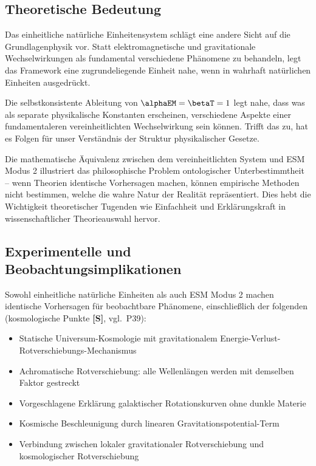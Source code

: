 	\subsection{Theoretische Bedeutung}
	\label{subsec:theoretical_significance}
	
	Das einheitliche natürliche Einheitensystem schlägt eine andere Sicht auf die Grundlagenphysik vor. Statt elektromagnetische und gravitationale Wechselwirkungen als fundamental verschiedene Phänomene zu behandeln, legt das Framework eine zugrundeliegende Einheit nahe, wenn in wahrhaft natürlichen Einheiten ausgedrückt.
	
	Die selbstkonsistente Ableitung von $\alphaEM = \betaT = 1$ legt nahe, dass was als separate physikalische Konstanten erscheinen, verschiedene Aspekte einer fundamentaleren vereinheitlichten Wechselwirkung sein können. Trifft das zu, hat es Folgen für unser Verständnis der Struktur physikalischer Gesetze.
	
	Die mathematische Äquivalenz zwischen dem vereinheitlichten System und ESM Modus 2 illustriert das philosophische Problem ontologischer Unterbestimmtheit – wenn Theorien identische Vorhersagen machen, können empirische Methoden nicht bestimmen, welche die wahre Natur der Realität repräsentiert. Dies hebt die Wichtigkeit theoretischer Tugenden wie Einfachheit und Erklärungskraft in wissenschaftlicher Theorieauswahl hervor.
	
	\subsection{Experimentelle und Beobachtungsimplikationen}
	\label{subsec:experimental_implications}
	
	Sowohl einheitliche natürliche Einheiten als auch ESM Modus 2 machen identische Vorhersagen für beobachtbare Phänomene, einschließlich der folgenden (kosmologische Punkte \textbf{[S]}, vgl.\ P39):
	
	\begin{itemize}
		\item Statische Universum-Kosmologie mit gravitationalem Energie-Verlust-Rotverschiebungs-Mechanismus
		\item Achromatische Rotverschiebung: alle Wellenlängen werden mit demselben Faktor gestreckt
		\item Vorgeschlagene Erklärung galaktischer Rotationskurven ohne dunkle Materie
		\item Kosmische Beschleunigung durch linearen Gravitationspotential-Term
		\item Verbindung zwischen lokaler gravitationaler Rotverschiebung und kosmologischer Rotverschiebung
	\end{itemize}
	
